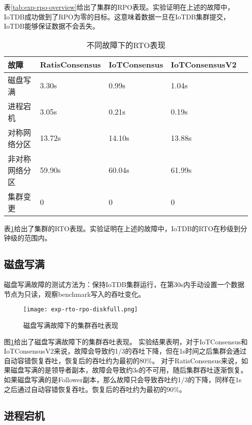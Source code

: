 表\ref{tab:exp-rpo-overview}给出了集群的RPO表现。实验证明在上述的故障中，IoTDB成功做到了RPO为零的目标。这意味着数据一旦在IoTDB集群提交，IoTDB能够保证数据不会丢失。



  \begin{table}[h!]
    \centering
    \caption{不同故障下的RTO表现}
    \label{tab:exp-rto-overview}
    \begin{tabular}{@{}lllll@{}}
        \toprule
        故障 & RatisConsensus & IoTConsensus & IoTConsensusV2 \\
        \midrule
        磁盘写满 & 3.30s & 0.99s & 1.04s \\
        进程宕机 & 3.05s & 0.21s & 0.19s \\
        对称网络分区 & 13.72s & 14.10s & 13.88s \\
        非对称网络分区 & 59.90s & 60.04s & 61.99s \\
        集群变更 & 0 & 0 & 0 \\
        \bottomrule
    \end{tabular}
  \end{table}

表\ref{tab:exp-rto-overview}给出了集群的RTO表现。实验证明在上述的故障中，IoTDB的RTO在秒级到分钟级的范围内。


\subsection{磁盘写满}

磁盘写满故障的测试方法为：保持IoTDB集群运行，在第30s内手动设置一个数据节点为只读，观察benchmark写入的吞吐变化。


\begin{figure}
    \centering
    \texttt{[image: exp-rto-rpo-diskfull.png]}
    \caption{磁盘写满故障下的集群吞吐表现}
    \label{fig:exp-rto-rpo-diskfull}
\end{figure}

图\ref{fig:exp-rto-rpo-diskfull}给出了磁盘写满故障下的集群吞吐表现。
实验结果表明，对于IoTConsensus和IoTConsensusV2来说，故障会导致约1/3的吞吐下降，但在1s时间之后集群会通过自动容错恢复吞吐，恢复后的吞吐约为最初的80\%。
对于RatisConsensus来说，如果磁盘写满的是领导者副本，故障会导致约3s的不可用，随后集群吞吐逐渐恢复。如果磁盘写满的是Follower副本，那么故障只会导致吞吐约1/3的下降，同样在1s之后通过自动容错恢复吞吐。恢复后的吞吐约为最初的90\%。

\subsection{进程宕机}

